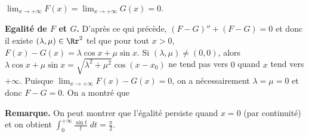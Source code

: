 {{\begin{center}
$\lim_{x \rightarrow +\infty}F(x)=\lim_{x \rightarrow +\infty}G(x)=0$.
\end{center}

\textbf{Egalité de $F$ et $G$.} D'après ce qui précède, $(F-G)''+(F-G)=0$ et donc il existe $(\lambda,\mu)\in\Rr^2$ tel que pour tout $x>0$, $F(x)-G(x)=\lambda\cos x+\mu\sin x$. Si $(\lambda,\mu)\neq(0,0)$, alors $\lambda\cos x+\mu\sin x=\sqrt{\lambda^2+\mu^2}\cos(x-x_0)$ ne tend pas vers $0$ quand $x$ tend vers $+\infty$. Puisque $\lim_{x \rightarrow +\infty}F(x)-G(x)=0$, on a nécessairement $\lambda=\mu=0$ et donc $F-G=0$. On a montré que

\begin{center}
\end{center}

\textbf{Remarque.} On peut montrer que l'égalité persiste quand $x=0$ (par continuité) et on obtient $\int_{0}^{+\infty} \frac{\sin t}{t}\;dt= \frac{\pi}{2}$.
}
}
